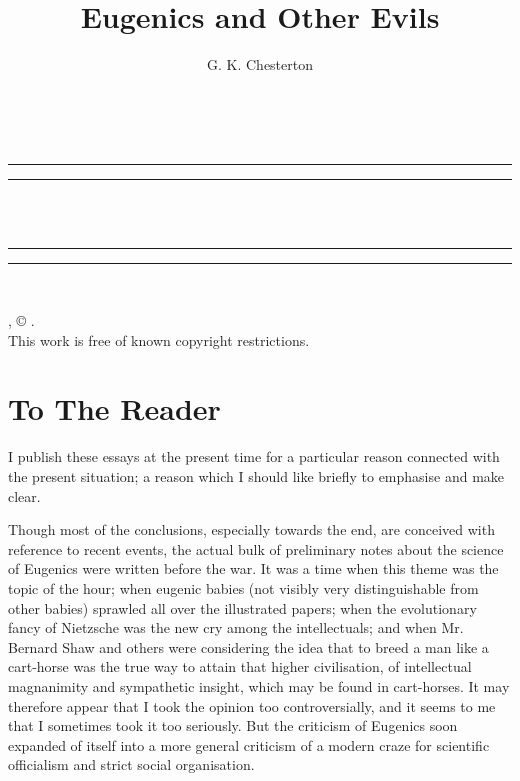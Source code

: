\documentclass{book}
\date{}
\title{Eugenics and Other Evils}
\author{G. K. Chesterton}
\begin{document}
\thispagestyle{empty}
\begin{center}
	{\Huge \@title   \\[5mm]}
\end{center}
\newpage
\thispagestyle{empty}
\cleardoublepage
\begin{center}
	\thispagestyle{empty}
	\vspace*{\baselineskip}
	\rule{\textwidth}{1.6pt}\vspace*{-\baselineskip}\vspace*{2pt}
	\rule{\textwidth}{0.4pt}\\[\baselineskip]
	{\Huge\scshape \@title   \\[5mm]}
	{\Large }
	\rule{\textwidth}{0.4pt}\vspace*{-\baselineskip}\vspace{3.2pt}
	\rule{\textwidth}{1.6pt}\\[\baselineskip]
	\vspace*{4\baselineskip}
	{\Large \@author}
	\vfill
\end{center}
\pagebreak
\newpage
\thispagestyle{empty}
\null\vfill
\noindent
\begin{center}
	{\emph{\@title}, © \@author.\\[5mm]}
	{This work is free of known copyright restrictions.\\[5mm]}
\end{center}
\pagebreak
\newpage
\setcounter{tocdepth}{0}
\setcounter{secnumdepth}{0}

\chapter*{To The Reader}
\label{chapter-0}
I publish these essays at the present time for a particular reason connected with the present situation; a reason which I should like briefly to emphasise and make clear.

Though most of the conclusions, especially towards the end, are conceived with reference to recent events, the actual bulk of preliminary notes about the science of Eugenics were written before the war. It was a time when this theme was the topic of the hour; when eugenic babies (not visibly very distinguishable from other babies) sprawled all over the illustrated papers; when the evolutionary fancy of Nietzsche was the new cry among the intellectuals; and when Mr. Bernard Shaw and others were considering the idea that to breed a man like a cart-horse was the true way to attain that higher civilisation, of intellectual magnanimity and sympathetic insight, which may be found in cart-horses. It may therefore appear that I took the opinion too controversially, and it seems to me that I sometimes took it too seriously. But the criticism of Eugenics soon expanded of itself into a more general criticism of a modern craze for scientific officialism and strict social organisation.
\end{document}
